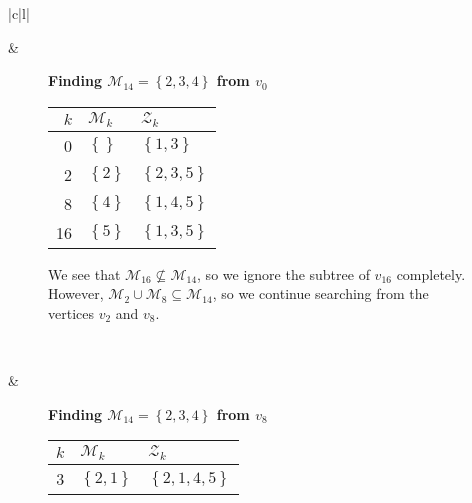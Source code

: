 \begin{figure*}[ht!]
    \centering
    \begin{tabular}[t]{|c|l|}\hline
    \begin{subfigure}[b]{0.35\textwidth}
        \centering
        
    \end{subfigure}
    & 
    \begin{subfigure}[b]{0.64\textwidth}
        \textbf{Finding $\mathcal{M}_{14} = \left\{{2,3,4}\right\}$ from $v_0$} \\
        \begin{tabular}{rll}
            $k$ & $\mathcal{M}_k$            & $\mathcal{Z}_k$ \\ \hline
            0   & $\left\{{}\right\}$        & $\left\{{1,3}\right\}$ \\ 
            2   & $\left\{{2}\right\}$       & $\left\{{2,3,5}\right\}$ \\ 
            8   & $\left\{{4}\right\}$       & $\left\{{1,4,5}\right\}$ \\ 
            16  & $\left\{{5}\right\}$       & $\left\{{1,3,5}\right\}$ \\ 
        \end{tabular}

        We see that $\mathcal{M}_{16} \not \subseteq \mathcal{M}_{14}$, so we
        ignore the subtree of $v_{16}$ completely. However, $\mathcal{M}_2 \cup
        \mathcal{M}_8 \subseteq \mathcal{M}_{14}$, so we
        continue searching from the vertices $v_2$ and $v_8$.
    \end{subfigure}
    \\ \hline
    \begin{subfigure}[b]{0.35\textwidth}
        \centering
        
    \end{subfigure}
    & 
    \begin{subfigure}[b]{0.64\textwidth}
        \textbf{Finding $\mathcal{M}_{14} = \left\{{2,3,4}\right\}$ from $v_8$} \\
        \begin{tabular}{rll}
            $k$ & $\mathcal{M}_k$            & $\mathcal{Z}_k$ \\ \hline
            3       & $\left\{{2,1}\right\}$     & $\left\{{2,1,4,5}\right\}$ \\ 
        \end{tabular}


\end{subfigure}
\end{tabular}
\end{figure*}
